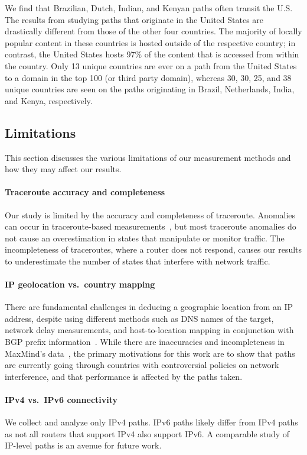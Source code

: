 We find that Brazilian, Dutch, Indian, and Kenyan paths
often transit the U.S. The results from
studying paths that originate in the United States are drastically different from
those
of the other four countries.  The majority of locally popular content in these countries
is hosted outside of the respective country; in contrast, the United States hosts
97\% of the
content that is accessed from within the country.  Only 13 unique countries
are ever on a path from the United States to a domain in the top 100 (or third party
domain), whereas 30, 30, 25, and 38 unique countries are seen on the paths
originating in Brazil, Netherlands, India, and Kenya, respectively.


\subsection{Limitations}

This section discusses the various limitations of our measurement methods
and how they may affect our results.

\paragraph{Traceroute accuracy and completeness}
Our study is limited by the accuracy and completeness of traceroute.
Anomalies can occur in traceroute-based
measurements~\cite{augustin2006avoiding}, but most traceroute anomalies
do not cause an overestimation in states that manipulate or monitor traffic.  The
incompleteness of traceroutes, where a router does not respond, causes
our results to underestimate the number of states that interfere with network 
traffic.

\paragraph{IP geolocation vs.\ country mapping}
There are fundamental challenges in deducing a geographic location
from an IP address, 
despite using different methods such as DNS names of the target,
network delay measurements, and host-to-location mapping in
conjunction with BGP prefix
information~\cite{padmanabhan2001investigation}.  While there are
inaccuracies and incompleteness in MaxMind's
data~\cite{huffaker2011geocompare}, the primary motivations for this work are to show that paths 
are currently going through countries with controversial policies on network interference, and that performance is affected by the 
paths taken.  

\paragraph{IPv4 vs.\ IPv6 connectivity}
We collect and analyze only IPv4 paths.  IPv6 paths likely
differ from IPv4 paths as not all routers that support IPv4 also support
IPv6.  A comparable study of IP-level paths is an avenue for future work.

